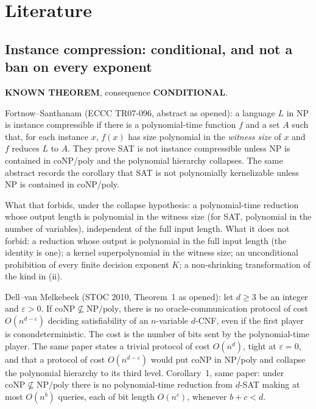 \documentclass[11pt]{article}
\begin{document}
\section{Literature}
\label{sec:lit}

\subsection*{Instance compression: conditional, and not a ban on every exponent}
\textbf{KNOWN THEOREM}, consequence \textbf{CONDITIONAL}.

Fortnow--Santhanam (ECCC TR07-096, abstract as opened): a language $L$ in NP is instance compressible if there is a polynomial-time function $f$ and a set $A$ such that, for each instance $x$, $f(x)$ has size polynomial in the \emph{witness size} of $x$ and $f$ reduces $L$ to $A$. They prove SAT is not instance compressible unless NP is contained in coNP/poly and the polynomial hierarchy collapses. The same abstract records the corollary that SAT is not polynomially kernelizable unless NP is contained in coNP/poly.

What that forbids, under the collapse hypothesis: a polynomial-time reduction whose output length is polynomial in the witness size (for SAT, polynomial in the number of variables), independent of the full input length. What it does not forbid: a reduction whose output is polynomial in the full input length (the identity is one); a kernel superpolynomial in the witness size; an unconditional prohibition of every finite decision exponent $K$; a non-shrinking transformation of the kind in (ii).

Dell--van Melkebeek (STOC 2010, Theorem~1 as opened): let $d\ge 3$ be an integer and $\varepsilon>0$. If $\mathrm{coNP}\not\subseteq\mathrm{NP}/\mathrm{poly}$, there is no oracle-communication protocol of cost $O(n^{d-\varepsilon})$ deciding satisfiability of an $n$-variable $d$-CNF, even if the first player is conondeterministic. The cost is the number of bits sent by the polynomial-time player. The same paper states a trivial protocol of cost $O(n^{d})$, tight at $\varepsilon=0$, and that a protocol of cost $O(n^{d-\varepsilon})$ would put coNP in NP/poly and collapse the polynomial hierarchy to its third level. Corollary~1, same paper: under $\mathrm{coNP}\not\subseteq\mathrm{NP}/\mathrm{poly}$ there is no polynomial-time reduction from $d$-SAT making at most $O(n^{b})$ queries, each of bit length $O(n^{c})$, whenever $b+c<d$.
\end{document}

